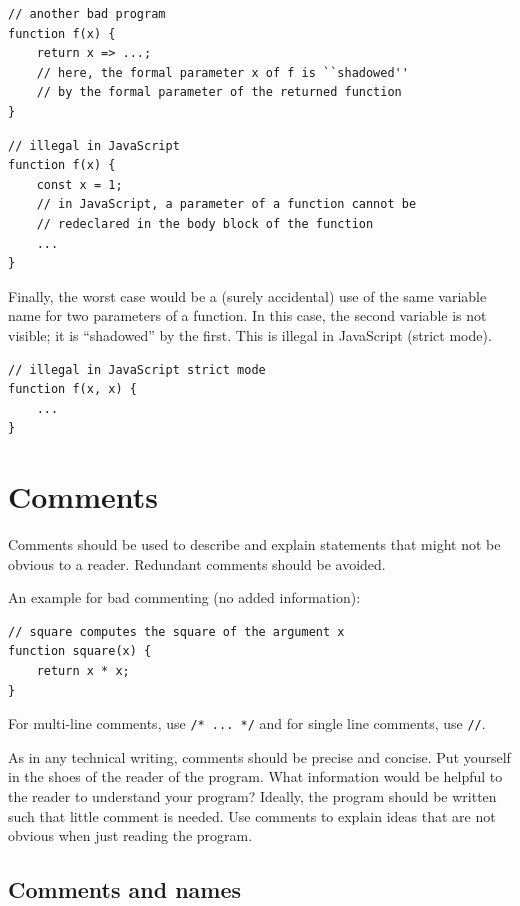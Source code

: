 \begin{lstlisting}
// another bad program
function f(x) {
    return x => ...;
    // here, the formal parameter x of f is ``shadowed'' 
    // by the formal parameter of the returned function
}
\end{lstlisting}

\begin{lstlisting}
// illegal in JavaScript
function f(x) {
    const x = 1;
    // in JavaScript, a parameter of a function cannot be 
    // redeclared in the body block of the function
    ...
}
\end{lstlisting}
Finally, the worst case would be a (surely accidental) 
use of the same variable name for two parameters of a function.
In this case, the second variable is not visible; it is ``shadowed''
by the first. This is illegal in JavaScript (strict mode).
\begin{lstlisting}
// illegal in JavaScript strict mode
function f(x, x) {
    ...
}
\end{lstlisting}

\vspace{-4mm}

\section*{Comments}
Comments should be used to describe and explain statements 
that might not be obvious to a reader.
Redundant comments should be avoided. 

An example for bad commenting (no added information):
\begin{lstlisting}
// square computes the square of the argument x
function square(x) {
    return x * x;
}
\end{lstlisting}
%
For multi-line comments, use \lstinline{/* ... */} and for single line comments, use \lstinline{//}.

As in any technical writing, comments should be precise and concise. Put yourself in the
shoes of the reader of the program. What information would be helpful to the reader to
understand your program? Ideally, the program should be written such that little comment is
needed. Use comments to explain ideas that are not obvious when just reading the program.

\subsection*{Comments and names}

